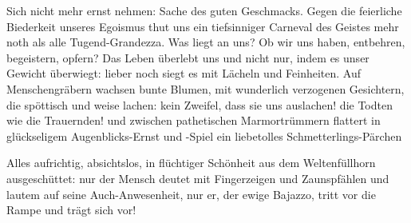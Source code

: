 Sich nicht mehr ernst nehmen: Sache des guten Geschmacks. Gegen die feierliche Biederkeit unseres Egoismus thut uns ein tiefsinniger Carneval des Geistes mehr noth als alle Tugend-Grandezza. Was liegt an uns? Ob wir uns haben, entbehren, begeistern, opfern? Das Leben überlebt uns und nicht nur, indem es unser Gewicht überwiegt: lieber noch siegt es mit Lächeln und Feinheiten. Auf Menschengräbern wachsen bunte Blumen, mit wunderlich verzogenen Gesichtern, die spöttisch und weise lachen: kein Zweifel, dass sie uns auslachen! die Todten wie die Trauernden! und zwischen pathetischen Marmortrümmern flattert in glückseligem Augenblicks-Ernst und -Spiel ein liebetolles Schmetterlings-Pärchen
\par

Alles aufrichtig, absichtslos, in flüchtiger Schönheit aus dem Weltenfüllhorn ausgeschüttet: nur der Mensch deutet mit Fingerzeigen und Zaunspfählen und lautem  auf seine Auch-Anwesenheit, nur er, der ewige Bajazzo, tritt vor die Rampe und trägt sich vor!
\par

